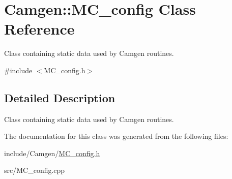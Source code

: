 \hypertarget{a00361}{\section{Camgen\-:\-:M\-C\-\_\-config Class Reference}
\label{a00361}
}


Class containing static data used by Camgen routines.  




{\ttfamily \#include $<$M\-C\-\_\-config.\-h$>$}



\subsection{Detailed Description}
Class containing static data used by Camgen routines. 

The documentation for this class was generated from the following files\-:\begin{DoxyCompactItemize}
\item 
include/\-Camgen/\hyperlink{a00670}{M\-C\-\_\-config.\-h}\item 
src/M\-C\-\_\-config.\-cpp\end{DoxyCompactItemize}

